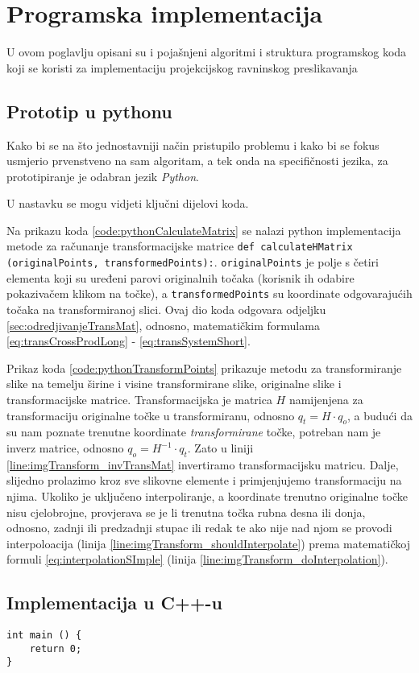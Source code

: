 \chapter{Programska implementacija}
\label{ch:implementacija}

U ovom poglavlju opisani su i pojašnjeni algoritmi i struktura programskog koda koji se koristi za implementaciju projekcijskog ravninskog preslikavanja

\section{Prototip u pythonu}
\label{sec:pythonProto}
\lstset{
	language=Python, 
	tabsize=2,
	numbers=left,
	breaklines=true,
	basicstyle=\ttfamily,
	columns=fixed
}

Kako bi se na što jednostavniji način pristupilo problemu i kako bi se fokus usmjerio prvenstveno na sam algoritam, a tek onda na specifičnosti jezika, za prototipiranje je odabran jezik \textit{Python}.

U nastavku se mogu vidjeti ključni dijelovi koda.



Na prikazu koda \ref{code:pythonCalculateMatrix} se nalazi python implementacija metode za računanje transformacijske matrice \lstinline!def calculateHMatrix (originalPoints, transformedPoints):!. \lstinline!originalPoints! je polje s četiri elementa koji su uređeni parovi originalnih točaka (korisnik ih odabire pokazivačem klikom na točke), a \lstinline!transformedPoints! su koordinate odgovarajućih točaka na transformiranoj slici. Ovaj dio koda odgovara odjeljku \ref{sec:odredjivanjeTransMat}, odnosno, matematičkim formulama \eqref{eq:transCrossProdLong} - \eqref{eq:transSystemShort}.



Prikaz koda \ref{code:pythonTransformPoints} prikazuje metodu za transformiranje slike na temelju širine i visine transformirane slike, originalne slike i transformacijske matrice. Transformacijska je matrica $H$ namijenjena za transformaciju originalne točke u transformiranu, odnosno $q_t = H \cdot q_o$, a budući da su nam poznate trenutne koordinate \emph{transformirane} točke, potreban nam je inverz matrice, odnosno $q_o = H^{-1} \cdot q_t$. Zato u liniji \ref{line:imgTransform_invTransMat} invertiramo transformacijsku matricu. Dalje, slijedno prolazimo kroz sve slikovne elemente i primjenjujemo transformaciju na njima. Ukoliko je uključeno interpoliranje, a koordinate trenutno originalne točke nisu cjelobrojne, provjerava se je li trenutna točka rubna desna ili donja, odnosno, zadnji ili predzadnji stupac ili redak te ako nije nad njom se provodi interpoloacija (linija \ref{line:imgTransform_shouldInterpolate}) prema matematičkoj formuli \eqref{eq:interpolationSImple} (linija \ref{line:imgTransform_doInterpolation}).

\section{Implementacija u C++-u}
\label{sec:implC++}
\lstset{
	language=C++, 
	tabsize=2,
	numbers=left
}

\begin{lstlisting}
int main () {
	return 0;
}
\end{lstlisting}